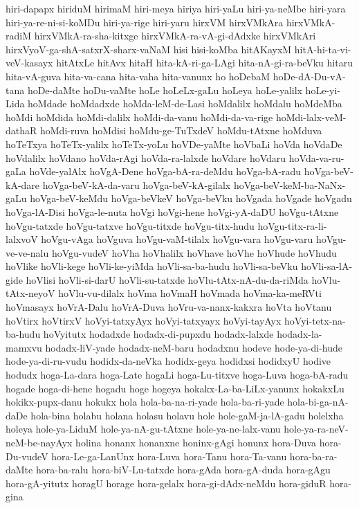 {hiri-dapapx
hiriduM
hirimaM
hiri-meya
hiriya
hiri-yaLu
hiri-ya-neMbe
hiri-yara
hiri-ya-re-ni-si-koMDu
hiri-ya-rige
hiri-yaru
hirxVM
hirxVMkAra
hirxVMkA-radiM
hirxVMkA-ra-sha-kitxge
hirxVMkA-ra-vA-gi-dAdxke
hirxVMkAri
hirxVyoV-ga-shA-satxrX-sharx-vaNaM
hisi
hisi-koMba
hitAKayxM
hitA-hi-ta-vi-veV-kasayx
hitAtxLe
hitAvx
hitaH
hita-kA-ri-ga-LAgi
hita-nA-gi-ra-beVku
hitaru
hita-vA-guva
hita-va-cana
hita-vaha
hita-vanunx
ho
hoDebaM
hoDe-dA-Du-vA-tana
hoDe-daMte
hoDu-vaMte
hoLe
hoLeLx-gaLu
hoLeya
hoLe-yalilx
hoLe-yi-Lida
hoMdade
hoMdadxde
hoMda-leM-de-Lasi
hoMdalilx
hoMdalu
hoMdeMba
hoMdi
hoMdida
hoMdi-dalilx
hoMdi-da-vanu
hoMdi-da-va-rige
hoMdi-lalx-veM-dathaR
hoMdi-ruva
hoMdisi
hoMdu-ge-TuTxdeV
hoMdu-tAtxne
hoMduva
hoTeTxya
hoTeTx-yalilx
hoTeTx-yoLu
hoVDe-yaMte
hoVbaLi
hoVda
hoVdaDe
hoVdalilx
hoVdano
hoVda-rAgi
hoVda-ra-lalxde
hoVdare
hoVdaru
hoVda-va-ru-gaLa
hoVde-yalAlx
hoVgA-Dene
hoVga-bA-ra-deMdu
hoVga-bA-radu
hoVga-beV-kA-dare
hoVga-beV-kA-da-varu
hoVga-beV-kA-gilalx
hoVga-beV-keM-ba-NaNx-gaLu
hoVga-beV-keMdu
hoVga-beVkeV
hoVga-beVku
hoVgada
hoVgade
hoVgadu
hoVga-lA-Disi
hoVga-le-nuta
hoVgi
hoVgi-hene
hoVgi-yA-daDU
hoVgu-tAtxne
hoVgu-tatxde
hoVgu-tatxve
hoVgu-titxde
hoVgu-titx-hudu
hoVgu-titx-ra-li-lalxvoV
hoVgu-vAga
hoVguva
hoVgu-vaM-tilalx
hoVgu-vara
hoVgu-varu
hoVgu-ve-ve-nalu
hoVgu-vudeV
hoVha
hoVhalilx
hoVhave
hoVhe
hoVhude
hoVhudu
hoVlike
hoVli-kege
hoVli-ke-yiMda
hoVli-sa-ba-hudu
hoVli-sa-beVku
hoVli-sa-lA-gide
hoVlisi
hoVli-si-darU
hoVli-su-tatxde
hoVlu-tAtx-nA-du-da-riMda
hoVlu-tAtx-neyoV
hoVlu-vu-dilalx
hoVma
hoVmaH
hoVmada
hoVma-ka-meRVti
hoVmasayx
hoVrA-Dalu
hoVrA-Duva
hoVru-va-nanx-kakxra
hoVta
hoVtanu
hoVtirx
hoVtirxV
hoVyi-tatxyAyx
hoVyi-tatxyayx
hoVyi-tayAyx
hoVyi-tetx-na-ba-hudu
hoVyitutx
hodadxde
hodadx-di-pupxdu
hodadx-lalxde
hodadx-la-mamxvu
hodadx-liV-yade
hodadx-neM-baru
hodadxnu
hodeve
hode-ya-di-hude
hode-ya-di-ru-vudu
hodidx-da-neVka
hodidx-geya
hodidxsi
hodidxyU
hodive
hodudx
hoga-La-dara
hoga-Late
hogaLi
hoga-Lu-titxve
hoga-Luva
hoga-bA-radu
hogade
hoga-di-hene
hogadu
hoge
hogeya
hokakx-La-ba-LiLx-yanunx
hokakxLu
hokikx-pupx-danu
hokukx
hola
hola-ba-na-ri-yade
hola-ba-ri-yade
hola-bi-ga-nA-daDe
hola-bina
holabu
holana
holasu
holavu
hole
hole-gaM-ja-lA-gadu
holelxha
holeya
hole-ya-LiduM
hole-ya-nA-gu-tAtxne
hole-ya-ne-lalx-vanu
hole-ya-ra-neV-neM-be-nayAyx
holina
honanx
honanxne
honinx-gAgi
honunx
hora-Duva
hora-Du-vudeV
hora-Le-ga-LanUnx
hora-Luva
hora-Tanu
hora-Ta-vanu
hora-ba-ra-daMte
hora-ba-ralu
hora-biV-Lu-tatxde
hora-gAda
hora-gA-duda
hora-gAgu
hora-gA-yitutx
horagU
horage
hora-gelalx
hora-gi-dAdx-neMdu
hora-giduR
hora-gina
}

